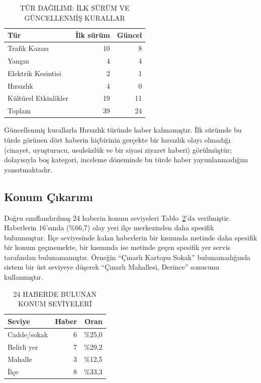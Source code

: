 \documentclass[conference,a4paper]{IEEEtran}
\begin{document}
\begin{table}[!t]
\caption{TÜR DAĞILIMI: İLK SÜRÜM VE GÜNCELLENMİŞ KURALLAR}
\label{tab:dagilim}
\centering\footnotesize
\begin{tabular}{@{}lrr@{}}
\toprule
\textbf{Tür} & \textbf{İlk sürüm} & \textbf{Güncel} \\
\midrule
Trafik Kazası & 10 & 8 \\
Yangın & 4 & 4 \\
Elektrik Kesintisi & 2 & 1 \\
Hırsızlık & 4 & 0 \\
Kültürel Etkinlikler & 19 & 11 \\
\midrule
Toplam & 39 & 24 \\
\bottomrule
\end{tabular}
\end{table}

Güncellenmiş kurallarla Hırsızlık türünde haber kalmamıştır. İlk sürümde bu türde
görünen dört haberin hiçbirinin gerçekte bir hırsızlık olayı olmadığı (cinayet,
uyuşturucu, usulsüzlük ve bir siyasi ziyaret haberi) görülmüştür; dolayısıyla
boş kategori, inceleme döneminde bu türde haber yayımlanmadığını yansıtmaktadır.

\subsection{Konum Çıkarımı}
Doğru sınıflandırılmış 24 haberin konum seviyeleri Tablo~\ref{tab:konumsonuc}'da
verilmiştir. Haberlerin 16'sında (\%66,7) olay yeri ilçe merkezinden daha spesifik
bulunmuştur. İlçe seviyesinde kalan haberlerin bir kısmında metinde daha spesifik
bir konum geçmemekte, bir kısmında ise metinde geçen spesifik yer servis
tarafından bulunamamıştır. Örneğin ``Çınarlı Kartopu Sokak'' bulunamadığında
sistem bir üst seviyeye düşerek ``Çınarlı Mahallesi, Derince'' sonucunu
kullanmıştır.

\begin{table}[!t]
\caption{24 HABERDE BULUNAN KONUM SEVİYELERİ}
\label{tab:konumsonuc}
\centering\footnotesize
\begin{tabular}{@{}lrr@{}}
\toprule
\textbf{Seviye} & \textbf{Haber} & \textbf{Oran} \\
\midrule
Cadde/sokak & 6 & \%25,0 \\
Belirli yer & 7 & \%29,2 \\
Mahalle & 3 & \%12,5 \\
İlçe & 8 & \%33,3 \\
\bottomrule
\end{tabular}
\end{table}
\end{document}
